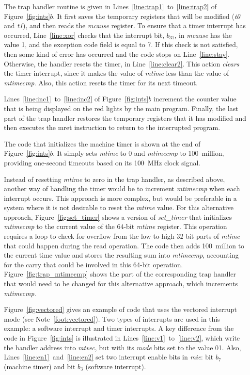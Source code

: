 \documentclass[11pt, twoside, pdftex]{article}
\begin{document}
The trap handler routine is given in Lines~\ref{line:trap1}~to~\ref{line:trap2} of
Figure~\ref{fig:ints}$b$.  It first saves the temporary registers that will be modified
({\it t0} and {\it t1}), and then reads the {\it mcause} register. To ensure that a timer
interrupt has occurred, Line~\ref{line:xor} checks that the interrupt bit, $b_{31}$, in
{\it mcause} has the value 1, and the exception code field is equal to 7. If this check is not
satisfied, then some kind of error has occurred and the code stops on
Line~\ref{line:stay}. Otherwise, the handler resets the timer, in
Line~\ref{line:clear2}. This action {\it clears} the timer 
interrupt, since it makes the value of {\it mtime} less than the value of 
{\it mtimecmp}. Also, this action resets the timer for its next timeout. 

Lines~\ref{line:inc1}~to~\ref{line:inc2} of Figure~\ref{fig:ints}$b$ increment the counter
value that is being displayed on the red lights by the main program. Finally, the last
part of the trap handler restores the temporary registers that it has modified and then 
executes the {\sf mret} instruction to return to the interrupted program.

The code that initializes the machine timer is shown at the end of
Figure~\ref{fig:ints}$b$. It simply sets {\it mtime} to 0 and {\it mtimecmp} to 100~million,
providing one-second timeouts based on its 100~MHz clock signal. 

Instead of resetting {\it mtime} to zero in the trap handler, as described above, another way
of handling the timer would be to increment {\it mtimecmp} when each interrupt occurs. 
This approach is more complex, but would be preferable in a system where it is not desirable 
to reset the {\it mtime} value. For this alternative approach, Figure~\ref{fig:set_timer} 
shows a version of {\it set\_timer} that initializes {\it mtimecmp} to the current value of 
the 64-bit {\it mtime} register. This operation requires a loop to check for overflow from 
the low-to-high 32-bit parts of {\it mtime} that could happen during the read operation. 
The code then adds 100~million to the current time value and stores the resulting sum into
{\it mtimecmp}, accounting for the carry that could be involved in this 64-bit operation.
Figure~\ref{fig:trap_mtimecmp} shows the part of the corresponding 
trap handler that would need to be changed for this alternative approach, which increments
{\it mtimecmp}. 

Figure~\ref{fig:vectored} gives an example of code that uses the vectored interrupt
mode (see Note~\ref{foot:vectored}). Two types of interrupts are used in this example:
a software interrupt and timer interrupts. A key difference from the
code in Figure~\ref{fig:ints} is illustrated in Lines~\ref{line:v1}~to~\ref{line:v2}, 
which write the handler address into {\it mtvec}, but with its {\it mode} bits set to the
value 01. Also, Lines~\ref{line:en1}~and~\ref{line:en2} set two interrupt enable bits in
{\it mie}: bit $b_7$ (machine timer) and bit $b_3$ (software interrupt). 
\end{document}
